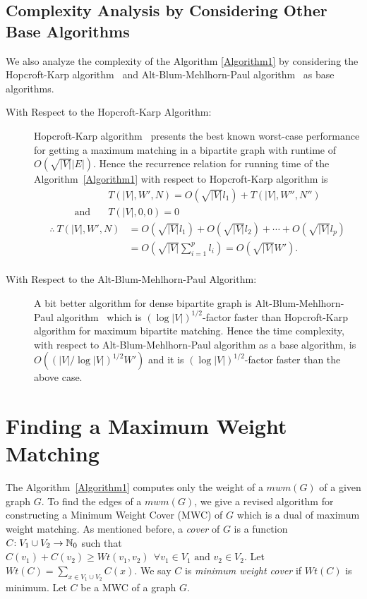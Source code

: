 \documentclass[runningheads,a4paper]{llncs}
\newcommand{\nint}{\mathbb{N}_0}
\newcommand{\cln}{\text{:\;}}
\begin{document}
\subsection{Complexity Analysis by Considering Other Base Algorithms}
We also analyze the complexity of the Algorithm \ref{Algorithm1} by
considering the Hopcroft-Karp algorithm~\cite{hopcroft73} and
Alt-Blum-Mehlhorn-Paul algorithm~\cite{alt91} as base algorithms.
\begin{description}
\item[With Respect to the Hopcroft-Karp Algorithm:]
Hopcroft-Karp algorithm~\cite{hopcroft73} presents the best known worst-case performance
for getting a maximum matching in a bipartite graph with runtime of
$O(\sqrt{|V|}|E|)$. Hence the recurrence relation for running time of
the Algorithm~\ref{Algorithm1} with respect to Hopcroft-Karp algorithm is
$$
\begin{array}{ll}
& T(|V|,W',{N})= O(\sqrt{|V|}l_1) + T(|V|,W'',N'') \\[4pt] 
\mbox{and}\quad &T(|V|,0,0)=0
\end{array}
$$
$$
\begin{array}{ll}
\therefore ~T(|V|,W',{N}) & = O(\sqrt{|V|}l_1) + O(\sqrt{|V|}l_2) + \cdots + O(\sqrt{|V|}l_p)\\[4pt]
 & = O\left(\sqrt{|V|}\sum\limits_{i=1}^p l_i\right) 
   = O(\sqrt{|V|}W').\\
\end{array}
$$

\item[With Respect to the Alt-Blum-Mehlhorn-Paul Algorithm:]
A bit better algorithm for dense bipartite graph is
Alt-Blum-Mehlhorn-Paul algorithm~\cite{alt91} which is 
$(\log |V|)^{1/2}$-factor faster
than Hopcroft-Karp algorithm for maximum
bipartite matching. Hence the time complexity, with respect to
Alt-Blum-Mehlhorn-Paul algorithm as a base algorithm, is
$O((|V|/\log |V|)^{1/2}W')$ and it is $(\log |V|)^{1/2}$-factor faster than the above case.

\end{description}

\section{Finding a Maximum Weight Matching} \label{Find_MWC}
The Algorithm~\ref{Algorithm1} computes
only the weight of a $\textit{mwm}(G)$ of a given graph $G$. To find the edges of a $\textit{mwm}(G)$, we give a revised
algorithm for constructing a Minimum Weight Cover (MWC) of $G$ which is a dual of maximum
weight matching.
As mentioned before, a \emph{cover} of $G$ is a function $C \cln V_1 \cup V_2 \rightarrow \nint$ such that
$C(v_1)+C(v_2) \geq \textit{Wt}(v_1,v_2) ~~ \forall v_1 \in V_1 \mbox{ and } v_2\in
V_2$. Let $\textit{Wt}(C)= \sum_{x\in V_1 \cup V_2} C(x)$. We say $C$ is \emph{minimum
weight cover} if $\textit{Wt}(C)$ is minimum. Let $C$ be a MWC of a graph $G$.
\end{document}
